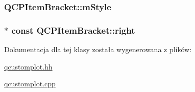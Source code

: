 \subsubsection[{\texorpdfstring{m\+Style}{mStyle}}]{ Q\+C\+P\+Item\+Bracket\+::m\+Style\hspace{0.3cm}{\ttfamily [protected]}}\hypertarget{class_q_c_p_item_bracket_ac911907184c824d621f274f8e0990080}{}\label{class_q_c_p_item_bracket_ac911907184c824d621f274f8e0990080}
\subsubsection[{\texorpdfstring{right}{right}}]{$\ast$ const Q\+C\+P\+Item\+Bracket\+::right}\hypertarget{class_q_c_p_item_bracket_afa6c1360b05a50c4e0df37b3cebab6be}{}\label{class_q_c_p_item_bracket_afa6c1360b05a50c4e0df37b3cebab6be}


Dokumentacja dla tej klasy została wygenerowana z plików\+:\begin{DoxyCompactItemize}
\item 
\hyperlink{qcustomplot_8hh}{qcustomplot.\+hh}\item 
\hyperlink{qcustomplot_8cpp}{qcustomplot.\+cpp}\end{DoxyCompactItemize}
